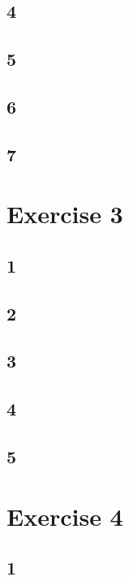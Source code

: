 \documentclass{article}
\begin{document}
    \subsection*{4}
    
    \subsection*{5}
    
    \subsection*{6}
    
    \subsection*{7}
    
  \section*{Exercise 3}
    \subsection*{1}
    
    \subsection*{2}
    
    \subsection*{3}
    
    \subsection*{4}
    
    \subsection*{5}
    
  \section*{Exercise 4}
    \subsection*{1}
    
\end{document}

